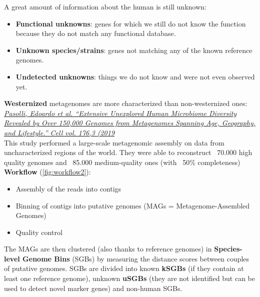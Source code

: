 A great amount of information about the human is still unknown:
\begin{itemize}
    \item \textbf{Functional unknowns}: genes for which we still do not know the function because they do not match any functional database.
    \item \textbf{Unknown species/strains}: genes not matching any of the known reference genomes.
    \item \textbf{Undetected unknowns}: things we do not know and were not even observed yet.
\end{itemize}

\textbf{Westernized} metagenomes are more characterized than non-westernized ones: \\

\href{https://www.sciencedirect.com/science/article/pii/S0092867419300017}{\emph{Pasolli, Edoardo et al. “Extensive Unexplored Human Microbiome Diversity Revealed by Over 150,000 Genomes from Metagenomes Spanning Age, Geography, and Lifestyle.” Cell vol. 176,3 (2019}}\\

This study performed a large-scale metagenomic assembly on data from uncharacterized regions of the world.
They were able to reconstruct ~70.000 high quality genomes and ~85.000 medium-quality ones (with ~50\% completeness)\\

\textbf{Workflow} (\ref{fig:workflow2}):
\begin{itemize}
    \item Assembly of the reads into contigs
    \item Binning of contigs into putative genomes (MAGs = Metagenome-Assembled Genomes)
    \item Quality control
\end{itemize}

The MAGs are then clustered (also thanks to reference genomes) in \textbf{Species-level Genome Bins} (SGBs) by measuring the distance scores between couples of putative genomes. SGBs are divided into known \textbf{kSGBs} (if they contain at least one reference genome), unknown \textbf{uSGBs} (they are not identified but can be used to detect novel marker genes) and non-human SGBs. \\

